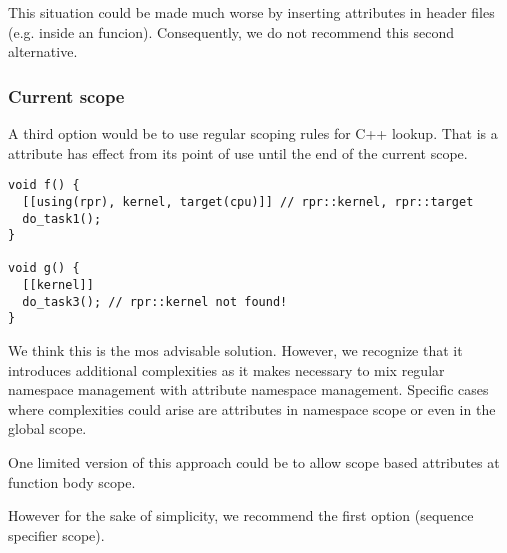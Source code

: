 This situation could be made much worse by inserting  attributes
in header files (e.g. inside an  funcion). Consequently, we
do not recommend this second alternative.

\subsubsection{Current scope}

A third option would be to use regular scoping rules for C++ lookup. That is
a  attribute has effect from its point of use until the end of
the current scope.

\begin{lstlisting}
void f() {
  [[using(rpr), kernel, target(cpu)]] // rpr::kernel, rpr::target
  do_task1();
}

void g() {
  [[kernel]]
  do_task3(); // rpr::kernel not found!
}
\end{lstlisting}

We think this is the mos advisable solution. However, we recognize that it introduces
additional complexities as it makes necessary to mix regular namespace management
with attribute namespace management. Specific cases where complexities could arise
are attributes in namespace scope or even in the global scope.

One limited version of this approach could be to allow scope based 
attributes at function body scope.

However for the sake of simplicity, we recommend the first option (sequence specifier scope).
